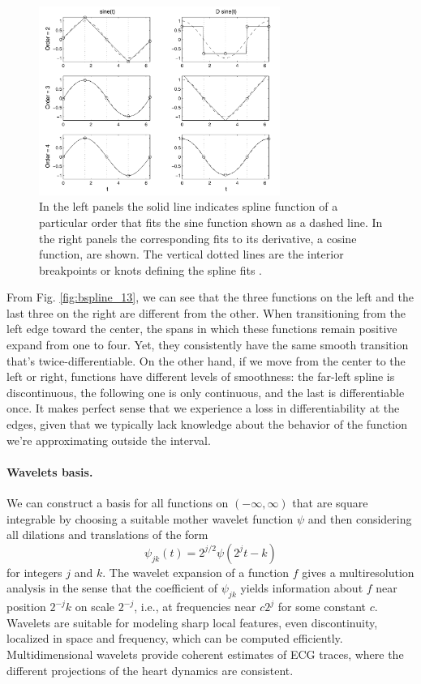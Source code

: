 \begin{figure}
\centering
\includegraphics[width=0.7\textwidth]{Images/bsplines.png}
\caption[Bsplines fitting.]{In the left panels the solid line indicates spline function of a particular order that fits the sine function shown as a dashed line. In the right panels the corresponding fits to its derivative, a cosine function, are shown. The vertical dotted lines are the interior breakpoints or knots defining the spline fits \cite{ramsay_functional_2006}.}
\label{fig:bsplines}
\end{figure}
From Fig. \ref{fig:bspline_13}, we can see that the three functions on the left and the last three on the right are different from the other. When transitioning from the left edge toward the center, the spans in which these functions remain positive expand from one to four. Yet, they consistently have the same smooth transition that's twice-differentiable. On the other hand, if we move from the center to the left or right, functions have different levels of smoothness: the far-left spline is discontinuous, the following one is only continuous, and the last is differentiable once. It makes perfect sense that we experience a loss in differentiability at the edges, given that we typically lack knowledge about the behavior of the function we're approximating outside the interval.
\paragraph{Wavelets basis.} We can construct a basis for all functions on $\left(- \infty, \infty \right)$ that are square integrable by choosing a suitable mother wavelet function $\psi$ and then considering all dilations and translations of the form
\begin{equation}
    \label{eq:wavelet}
    \psi_{j k}(t)=2^{j / 2} \psi\left(2^j t-k\right)
\end{equation}
for integers $j$ and $k$. The wavelet expansion of a function $f$ gives a multiresolution analysis in the sense that the coefficient of $\psi_{jk}$ yields information about $f$ near position $2^{-j}k$ on scale $2^{-j}$, i.e., at frequencies near $c2^j$ for some constant $c$. Wavelets are suitable for modeling sharp local features, even discontinuity, localized in space and frequency, which can be computed efficiently. Multidimensional wavelets provide coherent estimates of ECG traces, where the different projections of the heart dynamics are consistent.
